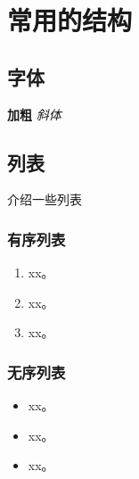 ﻿%

\chapter{常用的结构}
\label{chap02}
\section{字体}
\textbf{加粗}
\emph{斜体}

\section{列表}
介绍一些列表
\subsection{有序列表}
\begin{enumerate}
    \item xx。
    \item xx。
    \item xx。
\end{enumerate}
\subsection{无序列表}
\begin{itemize}
    \item xx。
    \item xx。
    \item xx。
\end{itemize}








